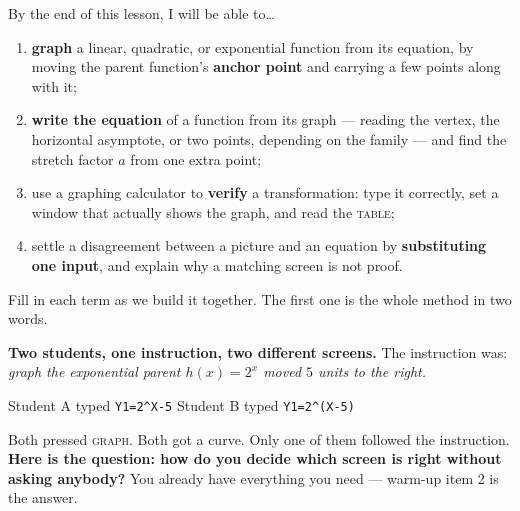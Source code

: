 \documentclass[10pt]{article}
\begin{document}

\vspace{0.15in}

\begin{objectivebox}
\small
By the end of this lesson, I will be able to\dots
\begin{enumerate}[leftmargin=1.5em, itemsep=2pt, topsep=3pt]
  \item \textbf{graph} a linear, quadratic, or exponential function from its equation, by moving the
        parent function's \textbf{anchor point} and carrying a few points along with it;
  \item \textbf{write the equation} of a function from its graph --- reading the vertex, the
        horizontal asymptote, or two points, depending on the family --- and find the stretch factor
        $a$ from one extra point;
  \item use a graphing calculator to \textbf{verify} a transformation: type it correctly, set a
        window that actually shows the graph, and read the \textsc{table};
  \item settle a disagreement between a picture and an equation by \textbf{substituting one input},
        and explain why a matching screen is not proof.
\end{enumerate}
\end{objectivebox}

\vspace{0.10in}

\boxguard
\begin{vocabbox}
\small
Fill in each term as we build it together. The first one is the whole method in two words.
\end{vocabbox}

\vspace{0.10in}

\boxguard[12]
\begin{hookbox}
\small
\textbf{Two students, one instruction, two different screens.} The instruction was: \emph{graph the
exponential parent $h(x)=2^x$ moved $5$ units to the right.}

\smallskip
Student A typed \quad \texttt{Y1=2\^{}X-5} \qquad Student B typed \quad \texttt{Y1=2\^{}(X-5)}

\smallskip
Both pressed \textsc{graph}. Both got a curve. Only one of them followed the instruction.
\textbf{Here is the question: how do you decide which screen is right without asking anybody?} You
already have everything you need --- warm-up item 2 is the answer.

\end{hookbox}
\end{document}
